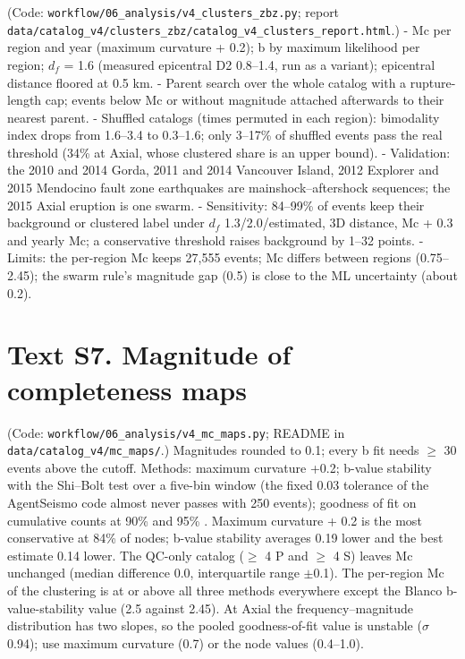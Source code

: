 \documentclass[11pt]{article}
\begin{document}
(Code: \texttt{workflow/06\_analysis/v4\_clusters\_zbz.py}; report
\texttt{data/catalog\_v4/clusters\_zbz/catalog\_v4\_clusters\_report.html}.)
- Mc per region and year (maximum curvature + 0.2); b by maximum
likelihood per region; \(d_f\) = 1.6 (measured epicentral D2 0.8--1.4,
run as a variant); epicentral distance floored at 0.5 km. - Parent
search over the whole catalog with a rupture-length cap; events below Mc
or without magnitude attached afterwards to their nearest parent. -
Shuffled catalogs (times permuted in each region): bimodality index
drops from 1.6--3.4 to 0.3--1.6; only 3--17\% of shuffled events pass
the real threshold (34\% at Axial, whose clustered share is an upper
bound). - Validation: the 2010 and 2014 Gorda, 2011 and 2014 Vancouver
Island, 2012 Explorer and 2015 Mendocino fault zone earthquakes are
mainshock--aftershock sequences; the 2015 Axial eruption is one swarm. -
Sensitivity: 84--99\% of events keep their background or clustered label
under \(d_f\) 1.3/2.0/estimated, 3D distance, Mc + 0.3 and yearly Mc; a
conservative threshold raises background by 1--32 points. - Limits: the
per-region Mc keeps 27,555 events; Mc differs between regions
(0.75--2.45); the swarm rule's magnitude gap (0.5) is close to the ML
uncertainty (about 0.2).

\section{Text S7. Magnitude of completeness
maps}\label{text-s7.-magnitude-of-completeness-maps}

(Code: \texttt{workflow/06\_analysis/v4\_mc\_maps.py}; README in
\texttt{data/catalog\_v4/mc\_maps/}.) Magnitudes rounded to 0.1; every b
fit needs \ensuremath{\geq} 30 events above the cutoff. Methods: maximum curvature +0.2;
b-value stability with the Shi--Bolt test over a five-bin window
\citep{Woessner2005, Shi1982} (the fixed 0.03 tolerance of the
AgentSeismo code almost never passes with 250 events); goodness of fit
on cumulative counts at 90\% and 95\% \citep{Wiemer2000}. Maximum
curvature + 0.2 is the most conservative at 84\% of nodes; b-value
stability averages 0.19 lower and the best estimate 0.14 lower. The
QC-only catalog (\ensuremath{\geq} 4 P and \ensuremath{\geq} 4 S) leaves Mc unchanged (median difference
0.0, interquartile range \ensuremath{\pm}0.1). The per-region Mc of the clustering is
at or above all three methods everywhere except the Blanco
b-value-stability value (2.5 against 2.45). At Axial the
frequency--magnitude distribution has two slopes, so the pooled
goodness-of-fit value is unstable (\ensuremath{\sigma} 0.94); use maximum curvature (0.7)
or the node values (0.4--1.0).
\end{document}
